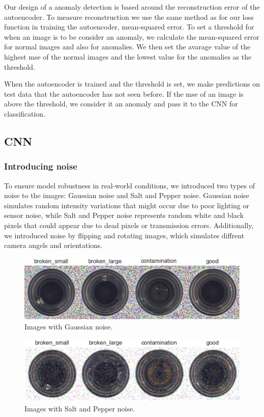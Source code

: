 Our design of a anomaly detection is based around the reconstruction error of the autoencoder. To measure reconstruction we use the same method as for our loss function in training the autoencoder, mean-squared error. To set a threshold for when an image is to be consider an anomaly, we calculate the mean-squared error for normal images and also for anomalies. We then set the avarage value of the highest mse of the normal images and the lowest value for the anomalies as the threshold.
\par
When the autoencoder is trained and the threshold is set, we make predictions on test data that the autoencoder has not seen before. If the mse of an image is above the threshold, we consider it an anomaly and pass it to the CNN for classification.

\subsection{CNN}

\subsubsection{Introducing noise}
To ensure model robustness in real-world conditions, we introduced two types of noise to the images: Gaussian noise and Salt and Pepper noise. 
Gaussian noise simulates random intensity variations that might occur due to poor lighting or sensor noise, while Salt and Pepper noise represents random white and black pixels that could appear due to dead pixels or transmission errors.
Additionally, we introduced noise by flipping and rotating images, which simulates diffrent camera angels and orientations.

\begin{figure}[H]
    \centering
    \includegraphics[scale=0.55]{src/images/dataset_w_gnoise.png}
    \caption{Images with Gaussian noise.}
    \label{fig:Gnoise}
\end{figure}
\begin{figure}[H]
    \centering
    \includegraphics[scale=0.55]{src/images/dataset_w_snp.png}
    \caption{Images with Salt and Pepper noise.}
    \label{fig:snpnoise}
\end{figure}

